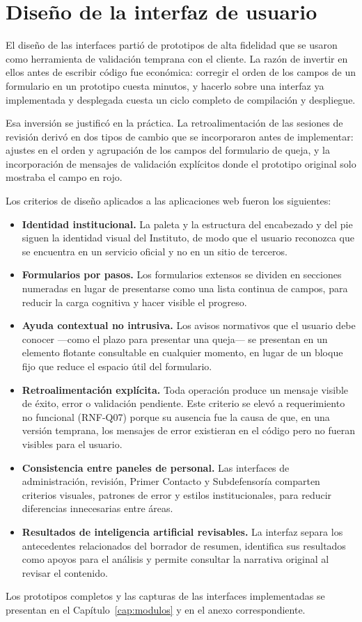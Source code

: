 	\section{Diseño de la interfaz de usuario}
	\label{sec:diseno_interfaz}
	El diseño de las interfaces partió de prototipos de alta fidelidad que se usaron como
	herramienta de validación temprana con el cliente. La razón de invertir en ellos antes de
	escribir código fue económica: corregir el orden de los campos de un formulario en un prototipo
	cuesta minutos, y hacerlo sobre una interfaz ya implementada y desplegada cuesta un ciclo
	completo de compilación y despliegue.
	
	Esa inversión se justificó en la práctica. La retroalimentación de las sesiones de revisión
	derivó en dos tipos de cambio que se incorporaron antes de implementar: ajustes en el orden y
	agrupación de los campos del formulario de queja, y la incorporación de mensajes de validación
	explícitos donde el prototipo original solo mostraba el campo en rojo.
	
	Los criterios de diseño aplicados a las aplicaciones web fueron los siguientes:
	
	\begin{itemize}
		\item \textbf{Identidad institucional.} La paleta y la estructura del encabezado y del pie
		siguen la identidad visual del Instituto, de modo que el usuario reconozca que se encuentra en
		un servicio oficial y no en un sitio de terceros.
	
		\item \textbf{Formularios por pasos.} Los formularios extensos se dividen en secciones
		numeradas en lugar de presentarse como una lista continua de campos, para reducir la carga
		cognitiva y hacer visible el progreso.
	
		\item \textbf{Ayuda contextual no intrusiva.} Los avisos normativos que el usuario debe
		conocer ---como el plazo para presentar una queja--- se presentan en un elemento flotante
		consultable en cualquier momento, en lugar de un bloque fijo que reduce el espacio útil del
		formulario.
	
		\item \textbf{Retroalimentación explícita.} Toda operación produce un mensaje visible de
		éxito, error o validación pendiente. Este criterio se elevó a requerimiento no funcional
		(RNF-Q07) porque su ausencia fue la causa de que, en una versión temprana, los mensajes de
		error existieran en el código pero no fueran visibles para el usuario.
	
		\item \textbf{Consistencia entre paneles de personal.} Las interfaces de administración,
		revisión, Primer Contacto y Subdefensoría comparten criterios visuales, patrones de
		error y estilos institucionales, para reducir diferencias innecesarias entre áreas.
		\item \textbf{Resultados de inteligencia artificial revisables.} La interfaz separa los
		antecedentes relacionados del borrador de resumen, identifica sus resultados como apoyos
		para el análisis y permite consultar la narrativa original al revisar el contenido.
	\end{itemize}
	
	Los prototipos completos y las capturas de las interfaces implementadas se presentan en el
	Capítulo~\ref{cap:modulos} y en el anexo correspondiente.
